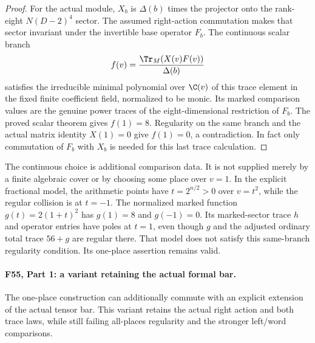 \documentclass[11pt,a4paper]{article}
\newcommand{\fid}[1]{\textsf{#1}}\newcommand{\gate}[1]{\textsf{#1}}
\theoremstyle{named}\newtheorem{finding}{Finding}[section]
\theoremstyle{definition}\newtheorem{definition}[finding]{Definition}
\theoremstyle{remark}\newtheorem{remark}[finding]{Remark}
\begin{document}
\begin{proof}
For the actual module, $X_b$ is $\Delta(b)$ times the
projector onto the rank-eight $N(D-2)^4$ sector.
The assumed right-action commutation makes that sector
invariant under the invertible base operator $F_b$.
The continuous scalar branch
\[
 f(v)=\frac{\Tr_M(X(v)F(v))}{\Delta(b)}
\]
satisfies the irreducible minimal polynomial over
$\C(v)$ of this trace element in the fixed finite
coefficient field, normalized to be monic.
Its marked comparison values are the genuine power
traces of the eight-dimensional restriction of $F_b$.
The proved scalar theorem gives $f(1)=8$.
Regularity on the same branch and the actual matrix
identity $X(1)=0$ give $f(1)=0$, a contradiction.
In fact only commutation of $F_b$ with $X_b$ is needed
for this last trace calculation.
\end{proof}

The continuous choice is additional comparison data.
It is not supplied merely by a finite algebraic cover
or by choosing some place over $v=1$.
In the explicit fractional model, the arithmetic points
have $t=2^{n/2}>0$ over $v=t^2$, while the regular
collision is at $t=-1$.
The normalized marked function $g(t)=2(1+t)^2$ has
$g(1)=8$ and $g(-1)=0$.
Its marked-sector trace $h$ and operator entries have
poles at $t=1$, even though $g$ and the adjusted
ordinary total trace $56+g$ are regular there.
That model does not satisfy this same-branch regularity
condition. Its one-place assertion remains valid.

\paragraph{\fid{F55}, Part 1: a variant retaining the actual formal bar.}
The one-place construction can additionally commute with
an explicit extension of the actual tensor bar.
This variant retains the actual right action and both
trace laws, while still failing all-places regularity
and the stronger left/word comparisons.
\end{document}
